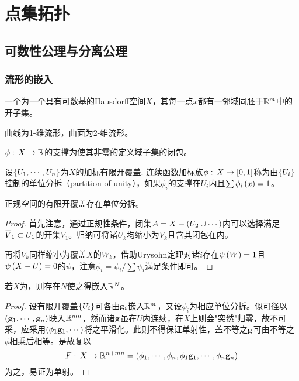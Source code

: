 \documentclass{ctexrep}
\begin{document}
\fi


\chapter{点集拓扑}
  \section{可数性公理与分离公理}
  \subsection{流形的嵌入}
  \begin{definition}
    一个\mmani 为一个具有可数基的Hausdorff空间$X$，其每一点$x$都有一邻域同胚于$\mathbb{R}^m$中的开子集。
  \end{definition}
  曲线为1-维流形，曲面为2-维流形。
  \begin{definition}
    $\phi:\, X \rightarrow \mathbb{R}$的支撑为使其非零的定义域子集的闭包。
  \end{definition}
  \begin{definition}
    设$\left\{U_1,\cdots,U_n\right\}$为$X$的加标有限开覆盖. 连续函数加标族$\phi:\, X \rightarrow \left[0,1\right]$称为由$\left\{U_i\right\}$控制的单位分拆（partition of unity），如果$\phi_i$的支撑在$U_i$内且$\sum \phi_i\left(x\right) = 1$。
  \end{definition}
  \begin{theorem}
    正规空间的有限开覆盖存在单位分拆。
  \end{theorem}
  \begin{proof}
    首先注意，通过正规性条件，闭集$A=X-\left(U_2\cup \cdots\right)$内可以选择满足$\clo{V}_1 \subset U_1$的开集$V_1$。归纳可将诸$U_k$均缩小为$V_k$且含其闭包在内。
    \par
    再将$V_k$同样缩小为覆盖$X$的$W_k$，借助Urysohn定理对诸$i$存在$\psi\left(W\right)=1$且$\psi\left(X-U\right)=0$的$\psi$，注意$\phi_i=\psi_i/\sum \psi_i$满足条件即可。
  \end{proof}
  \begin{theorem}
    若$X$为\mmani ，则存在$N$使之得嵌入$\mathbb{R}^N$。
  \end{theorem}
  \begin{proof}
    设有限开覆盖$\left\{U_i\right\}$可各由$\mathbf{g}_i$嵌入$\mathbb{R}^m$，又设$\phi_i$为相应单位分拆。似可径以$\left(\mathbf{g}_1,\cdots,\mathbf{g}_n\right)$映入$\mathbb{R}^{mn}$，然而诸$\mathbf{g}$虽在$U$内连续，在$X$上则会"突然"归零，故不可采，应采用$\left(\phi_1\mathbf{g}_1,\cdots\right)$将之平滑化。此则不得保证单射性，盖不等之$\mathbf{g}$可由不等之$\phi$相乘后相等。是故复以
    \[ F:\, X \rightarrow \mathbb{R}^{n+mn} = \left(\phi_1,\cdots,\phi_n,\phi_1\mathbf{g}_1,\cdots,\phi_n\mathbf{g}_n\right) \]
    为之，易证为单射。
  \end{proof}

 
\ifx\allfiles\undefined %
\end{document}
